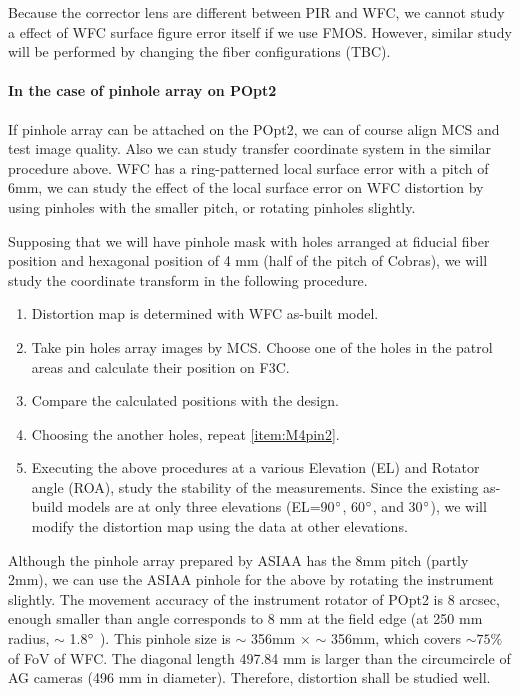 Because the corrector lens are different between PIR and WFC, we cannot study a effect of WFC surface figure error itself if we use FMOS.
However, similar study will be performed by changing the fiber configurations (TBC).

\paragraph{In the case of pinhole array on POpt2}
If pinhole array can be attached on the POpt2, we can of course align MCS and test image quality.
Also we can study transfer coordinate system in the similar procedure above.
WFC has a ring-patterned local surface error with a pitch of 6mm, we can study the effect of the local surface error on WFC distortion by using pinholes with the smaller pitch, or rotating pinholes slightly.

Supposing that we will have pinhole mask with holes arranged at fiducial fiber position and hexagonal position of 4 mm (half of the pitch of  Cobras), we will study the coordinate transform in the following procedure.
\begin{enumerate}
\item Distortion map is determined with WFC as-built model.
\item \label{item:M4pin2} Take pin holes array images by MCS.
Choose one of the holes in the patrol areas and calculate their position on F3C.
\item Compare the calculated positions with the design.
\item Choosing the another holes, repeat \ref{item:M4pin2}.
\item Executing the above procedures at a various Elevation (EL) and Rotator angle (ROA), study the stability of the measurements.
Since the existing as-build models are at only three elevations (EL=90$^\circ$, 60$^\circ$, and 30$^\circ$), we will modify the distortion map using the data at other elevations.
\end{enumerate}

Although the pinhole array prepared by ASIAA has the 8mm pitch (partly 2mm), we can use the ASIAA pinhole for the above by rotating the instrument slightly.
The movement accuracy of the instrument rotator of POpt2 is 8 arcsec, enough smaller than angle corresponds to 8 mm at the field edge (at 250 mm radius, $\sim$ 1.8$^\circ$ ).
This pinhole size is $\sim$ 356mm $\times$ $\sim$ 356mm, which covers $\sim 75\%$ of FoV of WFC.
The diagonal length 497.84 mm is larger than the circumcircle of AG cameras (496 mm in diameter).
Therefore, distortion shall be studied well.


